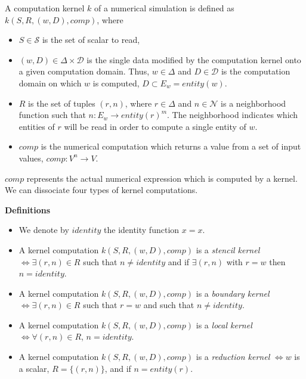 \begin{mydef}
A computation kernel $k$ of a numerical simulation is defined as $k(S,R,(w,D),comp)$, where 
\begin{itemize}
\item $S \in \mathcal{S}$ is the set of scalar to read, 
\item $(w,D) \in \Delta \times \mathcal{D}$ is the single data modified by the computation kernel onto a given computation domain. Thus, $w \in \Delta$ and $D \in \mathcal{D}$ is the computation domain on which $w$ is computed, $D \subset E_w=entity(w)$.
\item $R$ is the set of tuples $(r,n)$, where $r \in \Delta$ and $n \in \mathcal{N}$ is a neighborhood function such that $n : E_w \rightarrow entity(r)^m$. The neighborhood indicates which entities of $r$ will be read in order to compute a single entity of $w$. 
\item $comp$ is the numerical computation which returns a value from a set of input values, $comp: V^n \rightarrow V$.
\end{itemize}
\end{mydef}

$comp$ represents the actual numerical expression which is computed by a kernel. We can dissociate four types of kernel computations.

\noindent \textbf{Definitions}
\begin{itemize}
\item We denote by $identity$ the identity function $x=x$.
\item A kernel computation $k(S,R,(w,D),comp)$ is a \emph{stencil kernel} $\iff \exists (r,n) \in R$ such that $n \neq identity$ and if $\exists (r,n)$ with $r=w$ then $n=identity$.
\item A kernel computation $k(S,R,(w,D),comp)$ is a \emph{boundary kernel} $\iff \exists (r,n) \in R$ such that $r=w$ and such that $n \neq identity$.
\item A kernel computation $k(S,R,(w,D),comp)$ is a \emph{local kernel} $\iff \forall (r,n) \in R$, $n = identity$.
\item A kernel computation $k(S,R,(w,D),comp)$ is a \emph{reduction kernel} $\iff w$ is a scalar, $R=\{(r,n)\}$, and if $n=entity(r)$.
\end{itemize}

